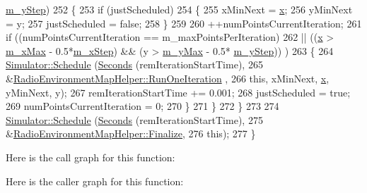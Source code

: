 \begin{DoxyCode}
      \hyperlink{classns3_1_1RadioEnvironmentMapHelper_ae8a3bb9ec904f4dd3c1f8326a2e23095}{m\_yStep})
252         \{
253           \textcolor{keywordflow}{if} (justScheduled)
254             \{
255               xMinNext = \hyperlink{lte__link__budget__x2__handover__measures_8m_a9336ebf25087d91c818ee6e9ec29f8c1}{x};
256               yMinNext = y;
257               justScheduled = \textcolor{keyword}{false};
258             \}
259           
260           ++numPointsCurrentIteration;
261           \textcolor{keywordflow}{if} ((numPointsCurrentIteration == m\_maxPointsPerIteration)
262               || ((\hyperlink{lte__link__budget__x2__handover__measures_8m_a9336ebf25087d91c818ee6e9ec29f8c1}{x} > \hyperlink{classns3_1_1RadioEnvironmentMapHelper_aa5f098561e72eacb242a5ecbb65a882f}{m\_xMax} - 0.5*\hyperlink{classns3_1_1RadioEnvironmentMapHelper_ab606ef89ff7410315f9dda782b9ca678}{m\_xStep}) && (y > \hyperlink{classns3_1_1RadioEnvironmentMapHelper_af8f02bf194b74569fb9f6b843d44b2ca}{m\_yMax} - 0.5*
      \hyperlink{classns3_1_1RadioEnvironmentMapHelper_ae8a3bb9ec904f4dd3c1f8326a2e23095}{m\_yStep})) )
263             \{
264               \hyperlink{classns3_1_1Simulator_a671882c894a08af4a5e91181bf1eec13}{Simulator::Schedule} (\hyperlink{group__timecivil_ga33c34b816f8ff6628e33d5c8e9713b9e}{Seconds} (remIterationStartTime), 
265                                    &\hyperlink{classns3_1_1RadioEnvironmentMapHelper_ae6b9af1e31cdc5cf11ef5879d5925908}{RadioEnvironmentMapHelper::RunOneIteration}
      ,
266                                    \textcolor{keyword}{this}, xMinNext, \hyperlink{lte__link__budget__x2__handover__measures_8m_a9336ebf25087d91c818ee6e9ec29f8c1}{x}, yMinNext, y);
267               remIterationStartTime += 0.001;
268               justScheduled = \textcolor{keyword}{true};
269               numPointsCurrentIteration = 0;
270             \}
271         \}      
272     \}
273 
274   \hyperlink{classns3_1_1Simulator_a671882c894a08af4a5e91181bf1eec13}{Simulator::Schedule} (\hyperlink{group__timecivil_ga33c34b816f8ff6628e33d5c8e9713b9e}{Seconds} (remIterationStartTime), 
275                        &\hyperlink{classns3_1_1RadioEnvironmentMapHelper_a8788344609c6baed271618f06a33f3f9}{RadioEnvironmentMapHelper::Finalize},
276                        \textcolor{keyword}{this});
277 \}
\end{DoxyCode}


Here is the call graph for this function\+:




Here is the caller graph for this function\+:


